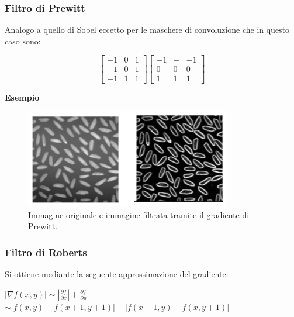 \newpage
\subsubsection{Filtro di Prewitt}
Analogo a quello di Sobel eccetto per le maschere di convoluzione
che in questo caso sono:
\begin{center}
    \[
        \begin{bmatrix}
            -1 & 0 & 1 \\
            -1 & 0 & 1 \\
            -1 & 1 & 1
        \end{bmatrix}
        \begin{bmatrix}
            -1 & - & -1 \\
            0  & 0 & 0  \\
            1  & 1 & 1
        \end{bmatrix}
    \]
\end{center}

\textbf{Esempio}

\begin{figure}[H]
    \centering
    \includegraphics[width=\linewidth, keepaspectratio]{capitoli/immagini/imgs/prewitt.png}
    \caption*{Immagine originale e immagine filtrata tramite il gradiente
        di Prewitt.}
\end{figure}

\newpage
\subsubsection{Filtro di Roberts}
Si ottiene mediante la seguente approssimazione del gradiente:

\begin{center}
    $|\nabla f(x,y)| \sim |\frac{\partial{f}}{\partial{x}}| + \frac{\partial{f}}{\partial{y}}$
    \\ $\sim |f(x,y) - f(x+1, y+1)| + |f(x+1, y) - f(x,y+1)|$
\end{center}

